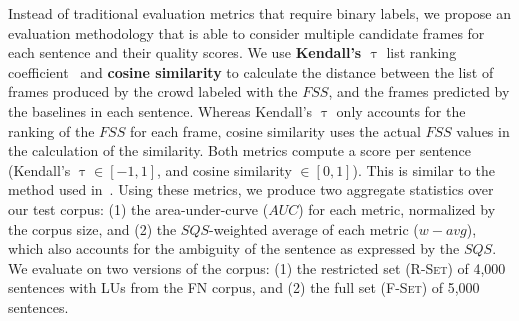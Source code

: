 Instead of traditional evaluation metrics that require binary labels, we propose an evaluation methodology that is able to consider multiple candidate frames for each sentence and their quality scores. We use \textbf{Kendall's $\uptau$} list ranking coefficient~\cite{kendall1938new} and \textbf{cosine similarity} to calculate the distance between the list of frames produced by the crowd labeled with the $FSS$, and the frames predicted by the baselines in each sentence. Whereas Kendall's $\uptau$ only accounts for the ranking of the $FSS$ for each frame, cosine similarity uses the actual $FSS$ values in the calculation of the similarity. Both metrics compute a score per sentence (Kendall's $\uptau \in [-1,1]$, and cosine similarity $\in [0,1]$). This is similar to the method used in~\cite{dumitrache2015b}.  Using these metrics, we produce two aggregate statistics over our test corpus: (1) the area-under-curve ($AUC$) for each metric, normalized by the corpus size, and (2) the $SQS$-weighted average of each metric ($w-avg$), which also accounts for the ambiguity of the sentence as expressed by the $SQS$. We evaluate on two versions of the corpus: (1) the restricted set (\textsc{R-Set}) of 4,000 sentences with LUs from the FN corpus, and (2) the full set (\textsc{F-Set}) of 5,000 sentences.

